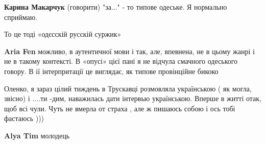 \begin{itemize}
\begin{itemize}
 
\textbf{Карина Макарчук} (говорити) "за..." - то типове одеське. Я нормально сприймаю.

 
То це тоді «одєсскій русскій суржик»

 
\textbf{Aria Fen} можливо, в аутентичної мови і так, але, впевнена, не в цьому жанрі і не в такому контексті. В «опусі» цієї пані я не відчула смачного одеського говору. В ії інтерпритації це виглядає, як типове провінційне бикоко
\end{itemize}

 

Оленко, я зараз цілий тиждень в Трускавці розмовляла українською ( як могла,
звісно) і ....ти -дим, наважилась дати інтервью українською. Вперше в житті
отак, щоб всі чули. Чуть не вмерла от страха , але ж пишаюсь собою і ось тобі
фастаюсь )))

\begin{itemize}
 
\textbf{Alya Tim} молодець

 

\end{itemize}
\end{itemize}

